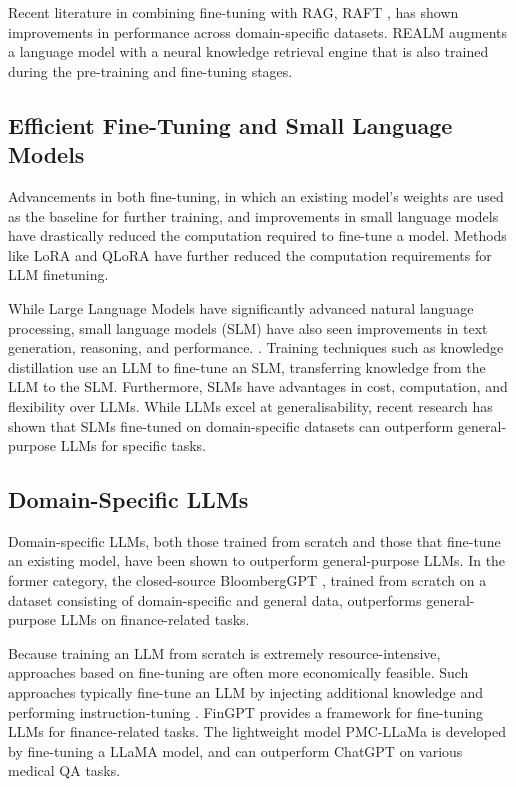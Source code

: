Recent literature in combining fine-tuning with RAG, RAFT \citep{zhang2024raft},
has shown improvements in performance across domain-specific datasets. REALM
\citep{guu_realm_2020} augments a language model with a neural knowledge
retrieval engine that is also trained during the pre-training and fine-tuning
stages.

\subsection{Efficient Fine-Tuning and Small Language Models}

Advancements in both fine-tuning, in which an existing model’s weights are used
as the baseline for further training, and improvements in small language models
have drastically reduced the computation required to fine-tune a model. Methods
like LoRA \citep{hu2021lora} and QLoRA \cite{dettmers2024qlora} have further
reduced the computation requirements for LLM finetuning.

While Large Language Models have significantly advanced natural language
processing, small language models (SLM) have also seen improvements in text
generation, reasoning, and performance. \cite{chen2024rolesmallmodelsllm}\cite{lu2024smalllanguagemodelssurvey}.
Training techniques such as knowledge distillation \cite{xu2024surveyknowledgedistillationlarge} 
use an LLM to fine-tune an SLM, transferring knowledge from the LLM to the SLM. 
Furthermore, SLMs have advantages in cost, computation, and flexibility over LLMs. 
While LLMs excel at generalisability, recent research has shown that SLMs fine-tuned 
on domain-specific datasets can outperform general-purpose LLMs for specific tasks.

\subsection{Domain-Specific LLMs}

Domain-specific LLMs, both those trained from scratch and those that fine-tune
an existing model, have been shown to outperform general-purpose LLMs. In the
former category, the closed-source BloombergGPT \citep{wu_bloomberggpt_2023},
trained from scratch on a dataset consisting of domain-specific and general
data, outperforms general-purpose LLMs on finance-related tasks.

Because training an LLM from scratch is extremely resource-intensive, approaches
based on fine-tuning are often more economically feasible. Such approaches
typically fine-tune an LLM by injecting additional knowledge and performing
instruction-tuning \citep{ouyang_training_2022}. FinGPT \citep{yang_fingpt_2023}
provides a framework for fine-tuning LLMs for finance-related tasks. The
lightweight model PMC-LLaMa \citep{wu_pmc-llama_2023} is developed by
fine-tuning a LLaMA model, and can outperform ChatGPT on various medical QA
tasks.
